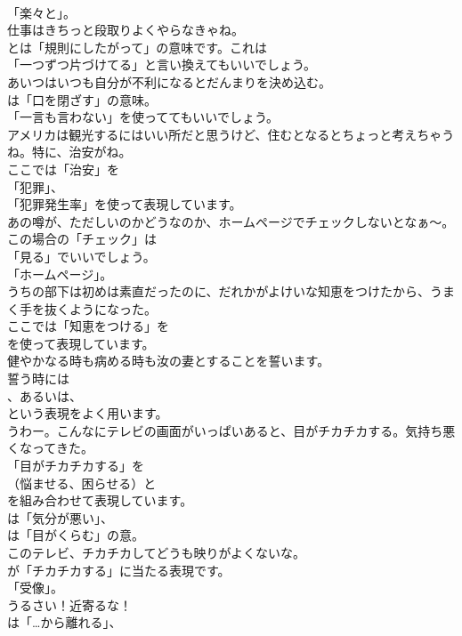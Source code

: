 \documentclass[8pt]{extreport}
\begin{document}
\begin{CJK}{UTF8}{min}
\\	「楽々と」。	
\\	仕事はきちっと段取りよくやらなきゃね。 
\\	とは「規則にしたがって」の意味です。これは
\\	「一つずつ片づけてる」と言い換えてもいいでしょう。	
\\	あいつはいつも自分が不利になるとだんまりを決め込む。 
\\	は「口を閉ざす」の意味。
\\	「一言も言わない」を使っててもいいでしょう。	
\\	アメリカは観光するにはいい所だと思うけど、住むとなるとちょっと考えちゃうね。特に、治安がね。 
\\	ここでは「治安」を
\\	「犯罪」、
\\	「犯罪発生率」を使って表現しています。	
\\	あの噂が、ただしいのかどうなのか、ホームページでチェックしないとなぁ～。 
\\	この場合の「チェック」は
\\	「見る」でいいでしょう。
\\	「ホームページ」。	
\\	うちの部下は初めは素直だったのに、だれかがよけいな知恵をつけたから、うまく手を抜くようになった。 
\\	ここでは「知恵をつける」を 
\\	を使って表現しています。	
\\	健やかなる時も病める時も汝の妻とすることを誓います。 
\\	誓う時には
\\	、あるいは、
\\	という表現をよく用います。	
\\	うわー。こんなにテレビの画面がいっぱいあると、目がチカチカする。気持ち悪くなってきた。 
\\	「目がチカチカする」を 
\\	（悩ませる、困らせる）と 
\\	を組み合わせて表現しています。
\\	は「気分が悪い」、
\\	は「目がくらむ」の意。	
\\	このテレビ、チカチカしてどうも映りがよくないな。 
\\	が「チカチカする」に当たる表現です。
\\	「受像」。	
\\	うるさい！近寄るな！ 
\\	は「…から離れる」、

\end{CJK}
\end{document}
